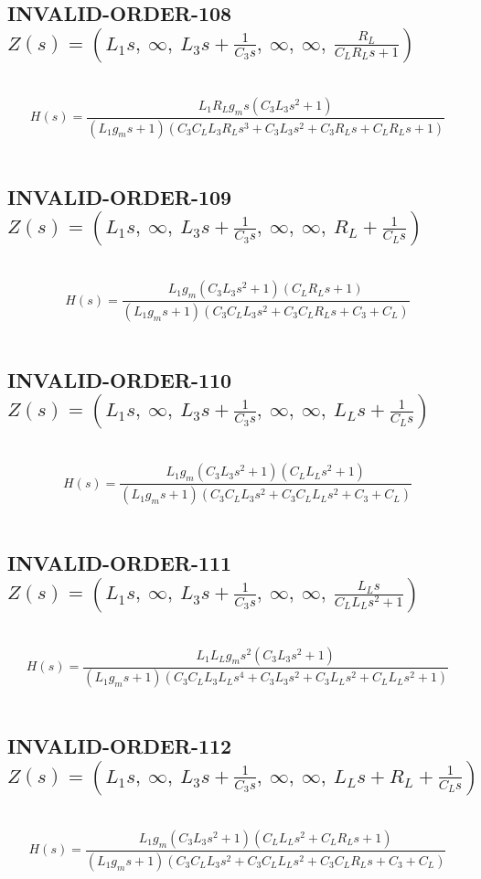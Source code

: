 \documentclass{article}
\begin{document}
\subsection{INVALID-ORDER-108 $Z(s) = \left( L_{1} s, \  \infty, \  L_{3} s + \frac{1}{C_{3} s}, \  \infty, \  \infty, \  \frac{R_{L}}{C_{L} R_{L} s + 1}\right)$ } \ 
\textbf{\[H(s) = \frac{L_{1} R_{L} g_{m} s \left(C_{3} L_{3} s^{2} + 1\right)}{\left(L_{1} g_{m} s + 1\right) \left(C_{3} C_{L} L_{3} R_{L} s^{3} + C_{3} L_{3} s^{2} + C_{3} R_{L} s + C_{L} R_{L} s + 1\right)}\] } \ 
\subsection{INVALID-ORDER-109 $Z(s) = \left( L_{1} s, \  \infty, \  L_{3} s + \frac{1}{C_{3} s}, \  \infty, \  \infty, \  R_{L} + \frac{1}{C_{L} s}\right)$ } \ 
\textbf{\[H(s) = \frac{L_{1} g_{m} \left(C_{3} L_{3} s^{2} + 1\right) \left(C_{L} R_{L} s + 1\right)}{\left(L_{1} g_{m} s + 1\right) \left(C_{3} C_{L} L_{3} s^{2} + C_{3} C_{L} R_{L} s + C_{3} + C_{L}\right)}\] } \ 
\subsection{INVALID-ORDER-110 $Z(s) = \left( L_{1} s, \  \infty, \  L_{3} s + \frac{1}{C_{3} s}, \  \infty, \  \infty, \  L_{L} s + \frac{1}{C_{L} s}\right)$ } \ 
\textbf{\[H(s) = \frac{L_{1} g_{m} \left(C_{3} L_{3} s^{2} + 1\right) \left(C_{L} L_{L} s^{2} + 1\right)}{\left(L_{1} g_{m} s + 1\right) \left(C_{3} C_{L} L_{3} s^{2} + C_{3} C_{L} L_{L} s^{2} + C_{3} + C_{L}\right)}\] } \ 
\subsection{INVALID-ORDER-111 $Z(s) = \left( L_{1} s, \  \infty, \  L_{3} s + \frac{1}{C_{3} s}, \  \infty, \  \infty, \  \frac{L_{L} s}{C_{L} L_{L} s^{2} + 1}\right)$ } \ 
\textbf{\[H(s) = \frac{L_{1} L_{L} g_{m} s^{2} \left(C_{3} L_{3} s^{2} + 1\right)}{\left(L_{1} g_{m} s + 1\right) \left(C_{3} C_{L} L_{3} L_{L} s^{4} + C_{3} L_{3} s^{2} + C_{3} L_{L} s^{2} + C_{L} L_{L} s^{2} + 1\right)}\] } \ 
\subsection{INVALID-ORDER-112 $Z(s) = \left( L_{1} s, \  \infty, \  L_{3} s + \frac{1}{C_{3} s}, \  \infty, \  \infty, \  L_{L} s + R_{L} + \frac{1}{C_{L} s}\right)$ } \ 
\textbf{\[H(s) = \frac{L_{1} g_{m} \left(C_{3} L_{3} s^{2} + 1\right) \left(C_{L} L_{L} s^{2} + C_{L} R_{L} s + 1\right)}{\left(L_{1} g_{m} s + 1\right) \left(C_{3} C_{L} L_{3} s^{2} + C_{3} C_{L} L_{L} s^{2} + C_{3} C_{L} R_{L} s + C_{3} + C_{L}\right)}\] } \ 
\end{document}
